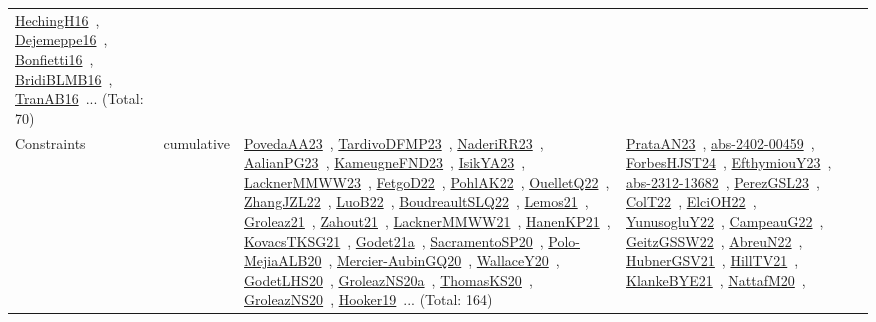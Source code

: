 {\begin{longtable}{lp{3cm}>{\raggedright\arraybackslash}p{6cm}>{\raggedright\arraybackslash}p{6cm}>{\raggedright\arraybackslash}p{8cm}}
\href{works/HechingH16.pdf}{HechingH16}~\cite{HechingH16}, \href{works/Dejemeppe16.pdf}{Dejemeppe16}~\cite{Dejemeppe16}, \href{works/Bonfietti16.pdf}{Bonfietti16}~\cite{Bonfietti16}, \href{works/BridiBLMB16.pdf}{BridiBLMB16}~\cite{BridiBLMB16}, \href{works/TranAB16.pdf}{TranAB16}~\cite{TranAB16}... (Total: 70)\\
Constraints & cumulative & \href{works/PovedaAA23.pdf}{PovedaAA23}~\cite{PovedaAA23}, \href{works/TardivoDFMP23.pdf}{TardivoDFMP23}~\cite{TardivoDFMP23}, \href{works/NaderiRR23.pdf}{NaderiRR23}~\cite{NaderiRR23}, \href{works/AalianPG23.pdf}{AalianPG23}~\cite{AalianPG23}, \href{works/KameugneFND23.pdf}{KameugneFND23}~\cite{KameugneFND23}, \href{works/IsikYA23.pdf}{IsikYA23}~\cite{IsikYA23}, \href{works/LacknerMMWW23.pdf}{LacknerMMWW23}~\cite{LacknerMMWW23}, \href{works/FetgoD22.pdf}{FetgoD22}~\cite{FetgoD22}, \href{works/PohlAK22.pdf}{PohlAK22}~\cite{PohlAK22}, \href{works/OuelletQ22.pdf}{OuelletQ22}~\cite{OuelletQ22}, \href{works/ZhangJZL22.pdf}{ZhangJZL22}~\cite{ZhangJZL22}, \href{works/LuoB22.pdf}{LuoB22}~\cite{LuoB22}, \href{works/BoudreaultSLQ22.pdf}{BoudreaultSLQ22}~\cite{BoudreaultSLQ22}, \href{works/Lemos21.pdf}{Lemos21}~\cite{Lemos21}, \href{works/Groleaz21.pdf}{Groleaz21}~\cite{Groleaz21}, \href{works/Zahout21.pdf}{Zahout21}~\cite{Zahout21}, \href{works/LacknerMMWW21.pdf}{LacknerMMWW21}~\cite{LacknerMMWW21}, \href{works/HanenKP21.pdf}{HanenKP21}~\cite{HanenKP21}, \href{works/KovacsTKSG21.pdf}{KovacsTKSG21}~\cite{KovacsTKSG21}, \href{works/Godet21a.pdf}{Godet21a}~\cite{Godet21a}, \href{works/SacramentoSP20.pdf}{SacramentoSP20}~\cite{SacramentoSP20}, \href{works/Polo-MejiaALB20.pdf}{Polo-MejiaALB20}~\cite{Polo-MejiaALB20}, \href{works/Mercier-AubinGQ20.pdf}{Mercier-AubinGQ20}~\cite{Mercier-AubinGQ20}, \href{works/WallaceY20.pdf}{WallaceY20}~\cite{WallaceY20}, \href{works/GodetLHS20.pdf}{GodetLHS20}~\cite{GodetLHS20}, \href{works/GroleazNS20a.pdf}{GroleazNS20a}~\cite{GroleazNS20a}, \href{works/ThomasKS20.pdf}{ThomasKS20}~\cite{ThomasKS20}, \href{works/GroleazNS20.pdf}{GroleazNS20}~\cite{GroleazNS20}, \href{works/Hooker19.pdf}{Hooker19}~\cite{Hooker19}... (Total: 164) & \href{works/PrataAN23.pdf}{PrataAN23}~\cite{PrataAN23}, \href{works/abs-2402-00459.pdf}{abs-2402-00459}~\cite{abs-2402-00459}, \href{works/ForbesHJST24.pdf}{ForbesHJST24}~\cite{ForbesHJST24}, \href{works/EfthymiouY23.pdf}{EfthymiouY23}~\cite{EfthymiouY23}, \href{works/abs-2312-13682.pdf}{abs-2312-13682}~\cite{abs-2312-13682}, \href{works/PerezGSL23.pdf}{PerezGSL23}~\cite{PerezGSL23}, \href{works/ColT22.pdf}{ColT22}~\cite{ColT22}, \href{works/ElciOH22.pdf}{ElciOH22}~\cite{ElciOH22}, \href{works/YunusogluY22.pdf}{YunusogluY22}~\cite{YunusogluY22}, \href{works/CampeauG22.pdf}{CampeauG22}~\cite{CampeauG22}, \href{works/GeitzGSSW22.pdf}{GeitzGSSW22}~\cite{GeitzGSSW22}, \href{works/AbreuN22.pdf}{AbreuN22}~\cite{AbreuN22}, \href{works/HubnerGSV21.pdf}{HubnerGSV21}~\cite{HubnerGSV21}, \href{works/HillTV21.pdf}{HillTV21}~\cite{HillTV21}, \href{works/KlankeBYE21.pdf}{KlankeBYE21}~\cite{KlankeBYE21}, \href{works/NattafM20.pdf}{NattafM20}~\cite{NattafM20}, 
\end{longtable}}
